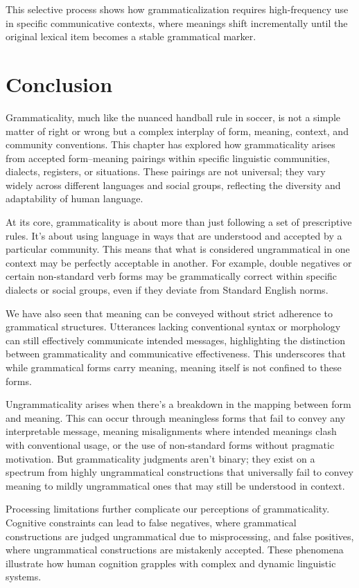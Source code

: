 This selective process shows how grammaticalization requires high-frequency use in specific communicative contexts, where meanings shift incrementally until the original lexical item becomes a stable grammatical marker.

\section{Conclusion}

Grammaticality, much like the nuanced handball rule in soccer, is not a simple matter of right or wrong but a complex interplay of form, meaning, context, and community conventions. This chapter has explored how grammaticality arises from accepted form–meaning pairings within specific linguistic communities, dialects, registers, or situations. These pairings are not universal; they vary widely across different languages and social groups, reflecting the diversity and adaptability of human language.

At its core, grammaticality is about more than just following a set of prescriptive rules. It's about using language in ways that are understood and accepted by a particular community. This means that what is considered ungrammatical in one context may be perfectly acceptable in another. For example, double negatives or certain non-standard verb forms may be grammatically correct within specific dialects or social groups, even if they deviate from Standard English norms.

We have also seen that meaning can be conveyed without strict adherence to grammatical structures. Utterances lacking conventional syntax or morphology can still effectively communicate intended messages, highlighting the distinction between grammaticality and communicative effectiveness. This underscores that while grammatical forms carry meaning, meaning itself is not confined to these forms.

Ungrammaticality arises when there's a breakdown in the mapping between form and meaning. This can occur through meaningless forms that fail to convey any interpretable message, meaning misalignments where intended meanings clash with conventional usage, or the use of non-standard forms without pragmatic motivation. But grammaticality judgments aren't binary; they exist on a spectrum from highly ungrammatical constructions that universally fail to convey meaning to mildly ungrammatical ones that may still be understood in context.

Processing limitations further complicate our perceptions of grammaticality. Cognitive constraints can lead to false negatives, where grammatical constructions are judged ungrammatical due to misprocessing, and false positives, where ungrammatical constructions are mistakenly accepted. These phenomena illustrate how human cognition grapples with complex and dynamic linguistic systems.


